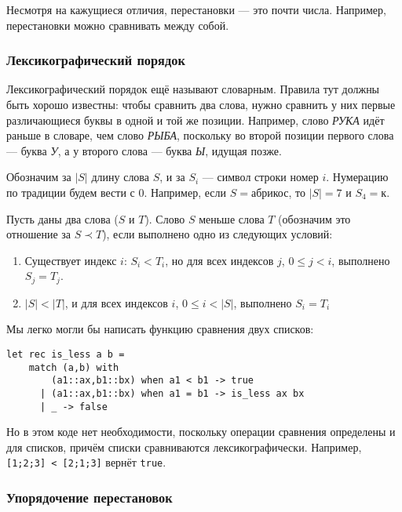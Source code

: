 \documentclass[12pt,a4paper,oneside]{article}
\begin{document}
Несмотря на кажущиеся отличия, перестановки --- это почти числа. Например, перестановки
можно сравнивать между собой.

\subsubsection{Лексикографический порядок}

Лексикографический порядок ещё называют словарным. Правила тут должны быть
хорошо известны: чтобы сравнить два слова, нужно сравнить у них первые различающиеся 
буквы в одной и той же позиции. 
Например, слово \emph{РУКА} идёт раньше в словаре, чем слово \emph{РЫБА}, поскольку во второй
позиции первого слова --- буква \emph{У}, а у второго слова --- буква \emph{Ы}, идущая позже.

\begin{definition}
Обозначим за $|S|$ длину слова $S$, и за $S_i$ --- символ строки номер $i$. Нумерацию по
традиции будем вести с $0$.
Например, если $S = \texttt{абрикос}$, то $|S|=7$ и $S_4=\texttt{к}$.
\end{definition}

\begin{definition}
Пусть даны два слова ($S$ и $T$).
Слово $S$ меньше слова $T$ (обозначим это отношение за $S \prec T$), 
если выполнено одно из следующих условий:
\begin{enumerate}
\item Существует индекс $i$: $S_i < T_i$, но для всех индексов $j$, $0 \le j < i$, выполнено $S_j = T_j$.
\item $|S| < |T|$, и для всех индексов $i$, $0 \le i < |S|$, выполнено $S_i=T_i$
\end{enumerate}
\end{definition}

Мы легко могли бы написать функцию сравнения двух списков:

\begin{verbatim}
let rec is_less a b =
    match (a,b) with
        (a1::ax,b1::bx) when a1 < b1 -> true
      | (a1::ax,b1::bx) when a1 = b1 -> is_less ax bx
      | _ -> false
\end{verbatim}

Но в этом коде нет необходимости, поскольку операции сравнения определены
и для списков, причём списки сравниваются лексикографически.
Например, \verb![1;2;3] < [2;1;3]! вернёт \verb!true!.

\subsubsection{Упорядочение перестановок}
\end{document}
